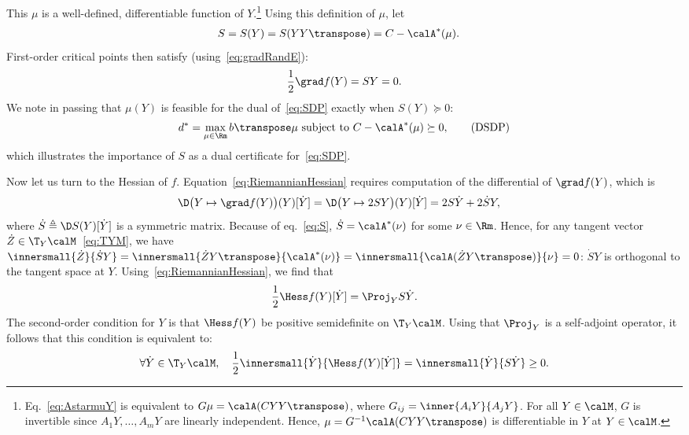 \documentclass{article}
\newcommand{\1}{\mathbf{1}}
\begin{document}
This $\mu$ is a well-defined, differentiable function of $Y$.\footnote{Eq.~\eqref{eq:AstarmuY} is equivalent to $G\mu = \calA(CYY\transpose)$, where $G_{ij} = \inner{A_iY}{A_jY}$. For all $Y\in\calM$, $G$
	is invertible since $A_1Y, \ldots, A_mY$ are linearly independent.
	Hence, $\mu = G^{-1} \calA(CYY\transpose)$ is differentiable in $Y$ at $Y\in\calM$.}
Using this definition of $\mu$, let
\begin{align}
	S & = S(Y) = S(YY\transpose) = C - \calA^*(\mu).
\label{eq:S}
\end{align}
First-order critical points then satisfy (using~\eqref{eq:gradRandE}):
\begin{align}
\frac{1}{2}\grad f(Y) = SY = 0.
\label{eq:firstorder}
\end{align}
We note in passing that $\mu(Y)$ is feasible for the dual of~\eqref{eq:SDP} exactly when $S(Y) \succeq 0$:
\begin{align}
d^* = \max_{\mu\in\Rm} b\transpose \mu \textrm{ subject to } C - \calA^*(\mu) \succeq 0,
\tag{DSDP}
\label{eq:DSDP}
\end{align}
which illustrates the importance of $S$ as a dual certificate for~\eqref{eq:SDP}.

Now let us turn to the Hessian of $f$. Equation~\eqref{eq:RiemannianHessian} requires computation of the differential of $\grad f(Y)$, which is
\begin{align*}
\D\big( Y \mapsto \grad f(Y) \big)(Y)[\dot Y] & = \D\big( Y \mapsto 2SY \big)(Y)[\dot Y] = 2S \dot Y + 2\dot SY,
\end{align*}
where $\dot S \triangleq \D S(Y)[\dot Y]$ is a symmetric matrix. Because of eq.~\eqref{eq:S}, $\dot S = \calA^*(\nu)$ for some $\nu \in \Rm$. Hence, for any tangent vector $\dot Z\in\T_Y\calM$~\eqref{eq:TYM}, we have $\innersmall{\dot Z}{\dot S Y} = \innersmall{\dot Z Y\transpose}{\calA^*(\nu)} = \innersmall{\calA(\dot Z Y\transpose)}{\nu} = 0$: $\dot S Y$ is orthogonal to the tangent space at $Y$. Using~\eqref{eq:RiemannianHessian}, we find that
\begin{align}
\frac{1}{2}\Hess f(Y)[\dot Y] = \Proj_Y S\dot Y.
\label{eq:secondorderfull}
\end{align}
The second-order condition for $Y$ is that $\Hess f(Y)$ be positive semidefinite on $\T_Y\calM$. Using that $\Proj_Y$ is a self-adjoint operator, it follows that this condition is equivalent to:
\begin{align}
\forall \dot Y \in \T_Y\calM, \quad \frac{1}{2} \innersmall{\dot Y}{\Hess f(Y)[\dot Y]}
= \innersmall{\dot Y}{S\dot Y} \geq 0.
\label{eq:secondorder}
\end{align}
\end{document}
